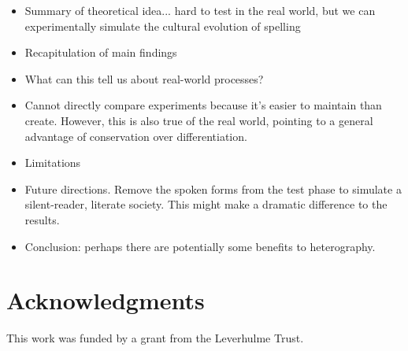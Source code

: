 \documentclass[doc,biblatex]{apa7}
\begin{document}
\begin{itemize}

	\item Summary of theoretical idea... hard to test in the real world, but we can experimentally simulate the cultural evolution of spelling

	\item Recapitulation of main findings

	\item What can this tell us about real-world processes?

	\item Cannot directly compare experiments because it's easier to maintain than create. However, this is also true of the real world, pointing to a general advantage of conservation over differentiation.

	\item Limitations

	\item Future directions. Remove the spoken forms from the test phase to simulate a silent-reader, literate society. This might make a dramatic difference to the results.

	\item Conclusion: perhaps there are potentially some benefits to heterography.

\end{itemize}


\section{Acknowledgments}

\noindent This work was funded by a grant from the Leverhulme Trust.

\printbibliography
\end{document}
